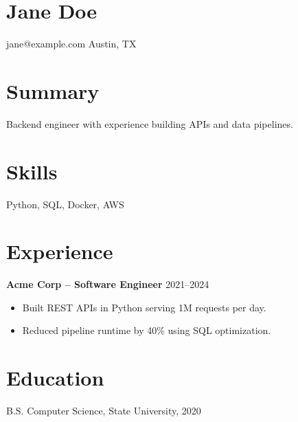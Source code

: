 \documentclass[11pt]{article}
\newcommand{\role}[2]{\textbf{#1} \hfill #2\\}
\begin{document}
\section*{Jane Doe}
jane@example.com \quad Austin, TX
\section*{Summary}
Backend engineer with experience building APIs and data pipelines.
\section*{Skills}
Python, SQL, Docker, AWS
\section*{Experience}
\role{Acme Corp -- Software Engineer}{2021--2024}
\begin{itemize}
\item Built REST APIs in Python serving 1M requests per day.
\item Reduced pipeline runtime by 40\% using SQL optimization.
\end{itemize}
\section*{Education}
B.S. Computer Science, State University, 2020
\end{document}
